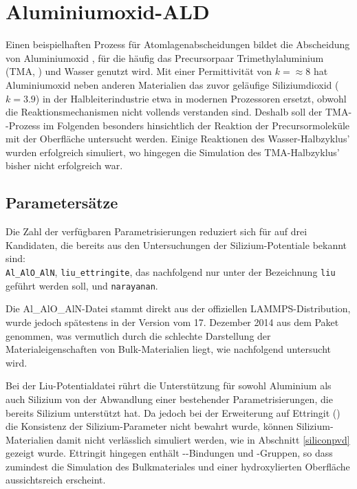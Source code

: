 \section{Aluminiumoxid-ALD}
\label{aluminaald}

Einen beispielhaften Prozess für Atomlagenabscheidungen bildet die Abscheidung von Aluminiumoxid \cite{puurunen_surface_2005}, für die häufig das Precursorpaar Trimethylaluminium (TMA, ) und Wasser genutzt wird.
Mit einer Permittivität von $k=\approx 8$ hat Aluminiumoxid neben anderen Materialien das zuvor geläufige Siliziumdioxid ($k=3.9$) in der Halbleiterindustrie etwa in modernen Prozessoren ersetzt, obwohl die Reaktionsmechanismen nicht vollends verstanden sind.
Deshalb soll der TMA--Prozess im Folgenden besonders hinsichtlich der Reaktion der Precursormoleküle mit der Oberfläche untersucht werden.
Einige Reaktionen des Wasser-Halbzyklus' wurden erfolgreich simuliert, wo hingegen die Simulation des TMA-Halbzyklus' bisher nicht erfolgreich war.

\subsection{Parametersätze}

Die Zahl der verfügbaren Parametrisierungen reduziert sich für  auf drei Kandidaten, die bereits aus den Untersuchungen der Silizium-Potentiale bekannt sind:\\
\texttt{Al\_AlO\_AlN}, \texttt{liu\_ettringite}, das nachfolgend nur unter der Bezeichnung \texttt{liu} geführt werden soll, und \texttt{narayanan}.

Die Al\_AlO\_AlN-Datei stammt direkt aus der offiziellen LAMMPS-Distribution, wurde jedoch spätestens in der Version vom 17. Dezember 2014 aus dem Paket genommen, was vermutlich durch die schlechte Darstellung der Materialeigenschaften von Bulk-Materialien liegt, wie nachfolgend untersucht wird.

Bei der Liu-Potentialdatei rührt die Unterstützung für sowohl Aluminium als auch Silizium von der Abwandlung einer bestehender Parametrisierungen, die bereits Silizium unterstützt hat.
Da jedoch bei der Erweiterung auf Ettringit () die Konsistenz der Silizium-Parameter nicht bewahrt wurde, können Silizium-Materialien damit nicht verlässlich simuliert werden, wie in Abschnitt \ref{siliconpvd} gezeigt wurde.
Ettringit hingegen enthält --Bindungen und -Gruppen, so dass zumindest die Simulation des Bulkmateriales und einer hydroxylierten Oberfläche aussichtsreich erscheint.

